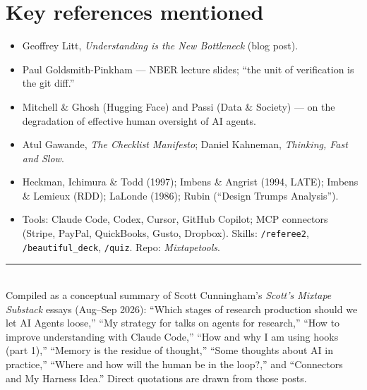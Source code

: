 \documentclass[11pt]{article}
\begin{document}
\section*{Key references mentioned}
\begin{itemize}
  \item Geoffrey Litt, \emph{Understanding is the New Bottleneck} (blog post).
  \item Paul Goldsmith-Pinkham --- NBER lecture slides; ``the unit of
  verification is the git diff.''
  \item Mitchell \& Ghosh (Hugging Face) and Passi (Data \& Society) --- on the
  degradation of effective human oversight of AI agents.
  \item Atul Gawande, \emph{The Checklist Manifesto}; Daniel Kahneman,
  \emph{Thinking, Fast and Slow}.
  \item Heckman, Ichimura \& Todd (1997); Imbens \& Angrist (1994, LATE);
  Imbens \& Lemieux (RDD); LaLonde (1986); Rubin (``Design Trumps Analysis'').
  \item Tools: Claude Code, Codex, Cursor, GitHub Copilot; MCP connectors
  (Stripe, PayPal, QuickBooks, Gusto, Dropbox). Skills: \texttt{/referee2},
  \texttt{/beautiful\_deck}, \texttt{/quiz}. Repo: \emph{Mixtapetools}.
\end{itemize}

\vfill
\noindent\rule{\linewidth}{0.4pt}\\
{\footnotesize Compiled as a conceptual summary of Scott Cunningham's
\emph{Scott's Mixtape Substack} essays (Aug--Sep 2026):
``Which stages of research production should we let AI Agents loose,''
``My strategy for talks on agents for research,''
``How to improve understanding with Claude Code,''
``How and why I am using hooks (part 1),''
``Memory is the residue of thought,''
``Some thoughts about AI in practice,''
``Where and how will the human be in the loop?,'' and
``Connectors and My Harness Idea.'' Direct quotations are drawn from those
posts.}
\end{document}
